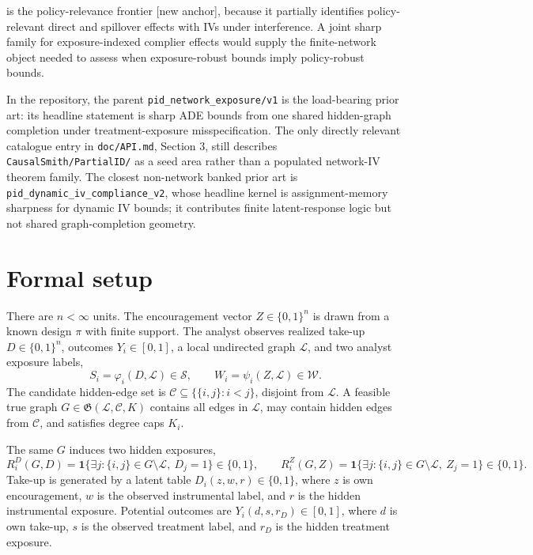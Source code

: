 \documentclass[11pt]{article}
\newcommand{\one}{\mathbf{1}}
\theoremstyle{definition}
\theoremstyle{plain}
\theoremstyle{remark}
\begin{document}
\citet{nibbering_oosterveen_2025_iv_interference_policy} is the policy-relevance frontier [new anchor], because it partially identifies policy-relevant direct and spillover effects with IVs under interference. A joint sharp family for exposure-indexed complier effects would supply the finite-network object needed to assess when exposure-robust bounds imply policy-robust bounds.

In the repository, the parent \texttt{pid\_network\_exposure/v1} is the load-bearing prior art: its headline statement is sharp ADE bounds from one shared hidden-graph completion under treatment-exposure misspecification. The only directly relevant catalogue entry in \texttt{doc/API.md}, Section 3, still describes \texttt{CausalSmith/PartialID/} as a seed area rather than a populated network-IV theorem family. The closest non-network banked prior art is \texttt{pid\_dynamic\_iv\_compliance\_v2}, whose headline kernel is assignment-memory sharpness for dynamic IV bounds; it contributes finite latent-response logic but not shared graph-completion geometry.

\section{Formal setup}
There are \(n<\infty\) units. The encouragement vector \(Z\in\{0,1\}^n\) is drawn from a known design \(\pi\) with finite support. The analyst observes realized take-up \(D\in\{0,1\}^n\), outcomes \(Y_i\in[0,1]\), a local undirected graph \(\mathcal L\), and two analyst exposure labels,
\[
S_i=\varphi_i(D,\mathcal L)\in\mathcal S,
\qquad
W_i=\psi_i(Z,\mathcal L)\in\mathcal W .
\]
The candidate hidden-edge set is \(\mathcal C\subseteq\{\{i,j\}:i<j\}\), disjoint from \(\mathcal L\). A feasible true graph \(G\in\mathfrak G(\mathcal L,\mathcal C,K)\) contains all edges in \(\mathcal L\), may contain hidden edges from \(\mathcal C\), and satisfies degree caps \(K_i\).

The same \(G\) induces two hidden exposures,
\[
R_i^D(G,D)=\one\{\exists j:\{i,j\}\in G\setminus\mathcal L,\ D_j=1\}\in\{0,1\},
\qquad
R_i^Z(G,Z)=\one\{\exists j:\{i,j\}\in G\setminus\mathcal L,\ Z_j=1\}\in\{0,1\}.
\]
Take-up is generated by a latent table \(D_i(z,w,r)\in\{0,1\}\), where \(z\) is own encouragement, \(w\) is the observed instrumental label, and \(r\) is the hidden instrumental exposure. Potential outcomes are \(Y_i(d,s,r_D)\in[0,1]\), where \(d\) is own take-up, \(s\) is the observed treatment label, and \(r_D\) is the hidden treatment exposure.
\end{document}
